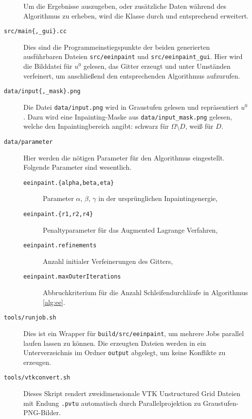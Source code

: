 \documentclass{mythesis}
\begin{document}
\begin{description}
	Um die Ergebnisse auszugeben, oder zusätzliche Daten während des Algorithmus zu erheben, wird die Klasse durch  und  entsprechend erweitert.
    \item[\texttt{src/main\{,_gui\}.cc}]
	Dies sind die Programmeinstiegspunkte der beiden generierten ausführbaren Dateien \texttt{src/eeinpaint} und \texttt{src/eeinpaint_gui}.
	Hier wird die Bilddatei für $u^0$ gelesen, das Gitter erzeugt und unter Umständen verfeinert, um anschließend den entsprechenden Algorithmus aufzurufen.
   \item[\texttt{data/input\{,_mask\}.png}]
	Die Datei \texttt{data/input.png} wird in Graustufen gelesen und repräsentiert $u^0$.
	Dazu wird eine Inpainting-Maske aus \texttt{data/input_mask.png} gelesen, welche den Inpaintingbereich angibt: schwarz für $\Omega \setminus D$, weiß für $D$.
    \item[\texttt{data/parameter}]
	Hier werden die nötigen Parameter für den Algorithmus eingestellt.
	Folgende Parameter sind wesentlich.
	\begin{description}
	    \item[\texttt{eeinpaint.\{alpha,beta,eta\}}]
		Parameter $\alpha$, $\beta$, $\gamma$ in der ursprünglichen Inpaintingenergie,
	    \item[\texttt{eeinpaint.\{r1,r2,r4\}}]
		Penaltyparameter für das Augmented Lagrange Verfahren,
	    \item[\texttt{eeinpaint.refinements}]
		Anzahl initialer Verfeinerungen des Gitters,
	    \item[\texttt{eeinpaint.maxOuterIterations}]
		Abbruchkriterium für die Anzahl Schleifendurchläufe in Algorithmus \ref{alg:ee}.
	\end{description}
    \item[\texttt{tools/runjob.sh}]
	Dies ist ein Wrapper für \texttt{build/src/eeinpaint}, um mehrere Jobs parallel laufen lassen zu können.
	Die erzeugten Dateien werden in ein Unterverzeichnis im Ordner \texttt{output} abgelegt, um keine Konflikte zu erzeugen.
    \item[\texttt{tools/vtkconvert.sh}]
	Dieses Skript rendert zweidimensionale VTK Unstructured Grid Dateien mit Endung \texttt{.pvtu} automatisch durch Parallelprojektion zu Graustufen-PNG-Bilder.
\end{description}
\end{document}
